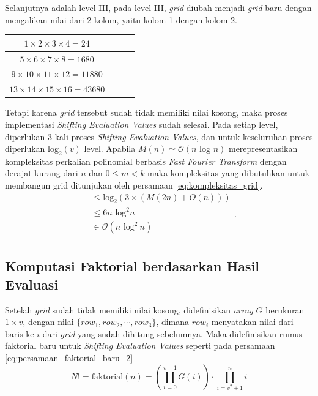 Selanjutnya adalah level III, pada level III, \textit{grid} diubah menjadi \textit{grid} baru dengan mengalikan nilai dari 2 kolom, yaitu kolom 1 dengan kolom 2.
\begin{table}[H]
	\centering
	\begin{tabular}{|c|c|c|c|} \hline
	$ 1  \times 2 \times 3 \times 4  = 24 $ \\ \hline
	$ 5  \times 6 \times 7 \times 8  = 1680 $ \\ \hline
	$ 9  \times 10 \times 11 \times 12  = 11880 $ \\ \hline
	$ 13 \times 14 \times 15 \times 16  = 43680 $ \\ \hline
	\end{tabular}
\end{table}
Tetapi karena \textit{grid} tersebut sudah tidak memiliki nilai kosong, maka proses implementasi \textit{Shifting Evaluation Values} sudah selesai. Pada setiap level, diperlukan 3 kali proses \textit{Shifting Evaluation Values}, dan untuk keseluruhan proses diperlukan $ \text{log}_2 (v) $ level. Apabila $ M(n) \simeq \mathcal{O}{(n \text{ log } n)} $ merepresentasikan kompleksitas perkalian polinomial berbasis \textit{Fast Fourier Transform} dengan derajat kurang dari $ n $ dan $ 0 \leq m < k $ maka kompleksitas yang dibutuhkan untuk membangun grid ditunjukan oleh persamaan \eqref{eq:kompleksitas_grid}.
\begin{equation}
	\begin{aligned}
			 &\leq \text{log}_2 (3 \times (M(2n) + O(n))) \\
			 &\leq 6n\text{ log}^2 n \\
			 &\in \mathcal{O}{(n \text{ log}^2\ n)} \\
	\end{aligned}
	\label{eq:kompleksitas_grid}.
\end{equation}

\subsection{Komputasi Faktorial berdasarkan Hasil Evaluasi}
Setelah \textit{grid} sudah tidak memiliki nilai kosong, didefinisikan \textit{array} $ G $ berukuran $ 1 \times v $, dengan nilai $ \{ row_1, row_2, \cdots, row_3 \} $, dimana $ row_i $ menyatakan nilai dari baris ke-$i$ dari \textit{grid} yang sudah dihitung sebelumnya. Maka didefinisikan rumus faktorial baru untuk \textit{Shifting Evaluation Values} seperti pada persamaan \eqref{eq:persamaan_faktorial_baru_2}
\begin{equation}
	N! = \text{faktorial}(n) = \left( \prod_{i=0}^{v-1} G(i) \right) \cdot \prod_{i=v^2+1}^n i
	\label{eq:persamaan_faktorial_baru_2}
\end{equation}

